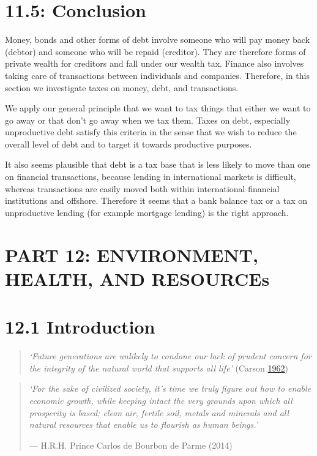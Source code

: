 \documentclass[]{tufte-handout}
\begin{document}
\hypertarget{conclusion}{%
\section{11.5: Conclusion}\label{conclusion}}

Money, bonds and other forms of debt involve someone who will pay money
back (debtor) and someone who will be repaid (creditor). They are
therefore forms of private wealth for creditors and fall under our
wealth tax. Finance also involves taking care of transactions between
individuals and companies. Therefore, in this section we investigate
taxes on money, debt, and transactions.

We apply our general principle that we want to tax things that either we
want to go away or that don't go away when we tax them. Taxes on debt,
especially unproductive debt satisfy this criteria in the sense that we
wish to reduce the overall level of debt and to target it towards
productive purposes.

It also seems plausible that debt is a tax base that is less likely to
move than one on financial transactions, because lending in
international markets is difficult, whereas transactions are easily
moved both within international financial institutions and offshore.
Therefore it seems that a bank balance tax or a tax on unproductive
lending (for example mortgage lending) is the right approach.

\newpage

\hypertarget{part-12-environment-health-and-resources}{%
\section{PART 12: ENVIRONMENT, HEALTH, AND
RESOURCEs}\label{part-12-environment-health-and-resources}}

\hypertarget{introduction-2}{%
\section{12.1 Introduction}\label{introduction-2}}

\begin{quote}
\emph{`Future generations are unlikely to condone our lack of prudent
concern for the integrity of the natural world that supports all life'}
(Carson \protect\hyperlink{ref-Carson1962}{1962})
\end{quote}

\begin{quote}
\emph{`For the sake of civilized society, it's time we truly figure out
how to enable economic growth, while keeping intact the very grounds
upon which all prosperity is based; clean air, fertile soil, metals and
minerals and all natural resources that enable us to flourish as human
beings.'}

\hfill --- H.R.H. Prince Carlos de Bourbon de Parme (2014)
\end{quote}
\end{document}
